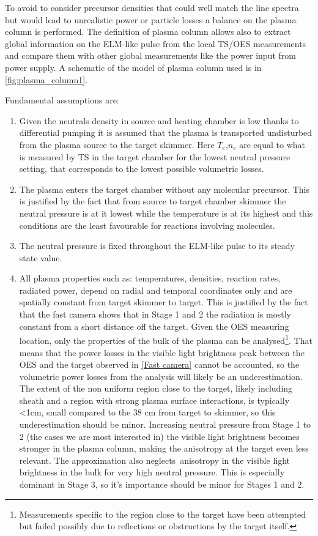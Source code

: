 To avoid to consider precursor densities that could well match the line spectra but would lead to unrealistic power or particle losses a balance on the plasma column is performed. The definition of plasma column allows also to extract global information on the ELM-like pulse from the local TS/OES measurements and compare them with other global measurements like the power input from power supply. A schematic of the model of plasma column used is in \autoref{fig:plasma_column1}.

Fundamental assumptions are:
\begin{enumerate}
    \item Given the neutrals density in source and heating chamber is low thanks to differential pumping it is assumed that the plasma is transported undisturbed from the plasma source to the target skimmer. Here $T_e$,$n_e$ are equal to what is measured by TS in the target chamber for the lowest neutral pressure setting, that corresponds to the lowest possible volumetric losses.
    \item The plasma enters the target chamber without any molecular precursor. This is justified by the fact that from source to target chamber skimmer the neutral pressure is at it lowest while the temperature is at its highest and this conditions are the least favourable for reactions involving molecules.
    \item The neutral pressure is fixed throughout the ELM-like pulse to its steady state value.
    \item All plasma properties such as: temperatures, densities, reaction rates, radiated power, depend on radial and temporal coordinates only and are spatially constant from target skimmer to target. This is justified by the fact that the fast camera shows that in Stage 1 and 2 the radiation is mostly constant from a short distance off the target. Given the OES measuring location, only the properties of the bulk of the plasma can be analysed\footnote{Measurements specific to the region close to the target have been attempted but failed possibly due to reflections or obstructions by the target itself.}. That means that the power losses in the visible light brightness peak between the OES and the target observed in \autoref{Fast camera} cannot be accounted, so the volumetric power losses from the analysis will likely be an underestimation. The extent of the non uniform region close to the target, likely including sheath and a region with strong plasma surface interactions, is typically <1cm, small compared to the 38 cm from target to skimmer, so this underestimation should be minor. Increasing neutral pressure from Stage 1 to 2 (the cases we are most interested in) the visible light brightness becomes stronger in the plasma column, making the anisotropy at the target even less relevant. The approximation also neglects\ anisotropy in the visible light brightness in the bulk for very high neutral pressure. This is especially dominant in Stage 3, so it's importance should be minor for Stages 1 and 2.

\end{enumerate}
